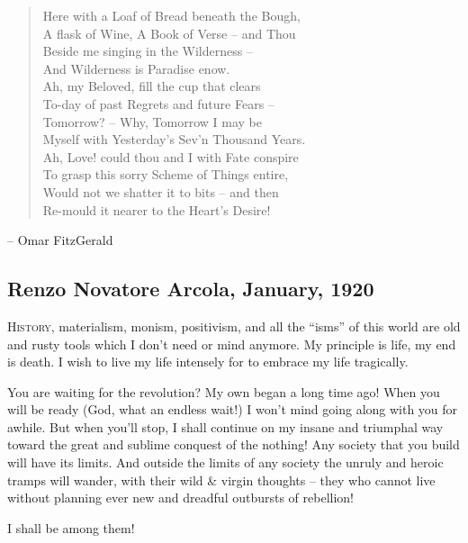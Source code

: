 \documentclass[a4paper,english,10pt,twoside]{article}
\begin{document}
\begin{verse}
    Here with a Loaf of Bread beneath the Bough,\\
    A flask of Wine, A Book of Verse -- and Thou\\
    Beside me singing in the Wilderness -- \\
    And Wilderness is Paradise enow.\\
    Ah, my Beloved, fill the cup that clears\\
    To-day of past Regrets and future Fears -- \\
    Tomorrow? -- Why, Tomorrow I may be\\
    Myself with Yesterday's Sev'n Thousand Years.\\
    Ah, Love! could thou and I with Fate conspire\\
    To grasp this sorry Scheme of Things entire,\\
    Would not we shatter it to bits -- and then\\
    Re-mould it nearer to the Heart's Desire!\\
\end{verse}

\begin{flushright} -- Omar FitzGerald\end{flushright}

\subsection{Renzo Novatore Arcola, January, 1920}

\lettrine{H}{istory}, materialism, monism, positivism, and all the \enquote{isms} of this world are old and rusty tools which I don't need or mind anymore. My principle is life, my end is death. I wish to live my life intensely for to embrace my life tragically.

\medskip
You are waiting for the revolution? My own began a long time ago! When you will be ready (God, what an endless wait!) I won't mind going along with you for awhile. But when you'll stop, I shall continue on my insane and triumphal way toward the great and sublime conquest of the nothing! Any society that you build will have its limits. And outside the limits of any society the unruly and heroic tramps will wander, with their wild \& virgin thoughts -- they who cannot live without planning ever new and dreadful outbursts of rebellion!

\medskip
\noindent I shall be among them!
\end{document}
